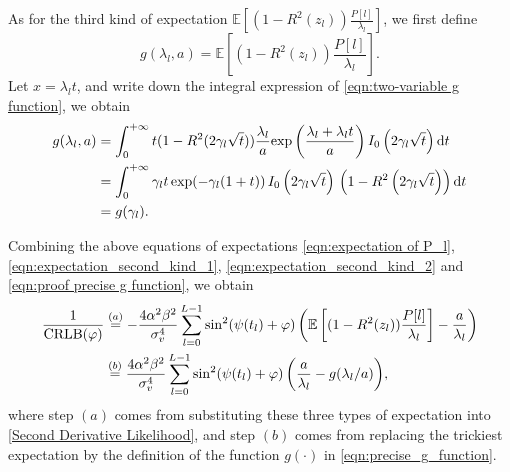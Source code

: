 \documentclass[journal,twocolumn]{IEEEtran}
\theoremstyle{nonumberplain}
\def \exp {\text{exp}}
\begin{document}
    As for the third kind of expectation $\mathbb{E}\left[(1-R^2(z_l))\frac{P[l]}{\lambda_l}\right]$, we first define 
    \begin{equation}
        g(\lambda_l, a) = \mathbb{E}\left[(1-R^2(z_l))\frac{P[l]}{\lambda_l}\right].
        \label{eqn:two-variable g function}
    \end{equation}
    Let $x=\lambda_l t$, and write down the integral expression of \eqref{eqn:two-variable g function}, we obtain 
    \begin{equation}
        \begin{aligned}
        g(\lambda_l, a) & = \int_{0}^{+\infty} t(1-R^2(2\gamma_l\sqrt{t})) \frac{\lambda_l}{a} \exp\left(\frac{\lambda_l + \lambda_l t}{a}\right) I_0\left(2\gamma_l\sqrt{t}\right){\rm d}t \\
        & = \int_{0}^{+\infty}\gamma_l t \, \exp(-\gamma_l(1+t))\, I_0\left(2\gamma_l\sqrt{t}\right)\,\left(1-R^2\left(2\gamma_l\sqrt{t}\right)\right){\rm d}t \\
        & = g(\gamma_l).
        \end{aligned}
        \label{eqn:proof precise g function}
    \end{equation}
    
    Combining the above equations of expectations \eqref{eqn:expectation of P_l}, \eqref{eqn:expectation_second_kind_1}, \eqref{eqn:expectation_second_kind_2} and \eqref{eqn:proof precise g function}, we obtain
    \begin{equation}
        \begin{aligned}
        \frac{1}{{\rm CRLB}(\varphi)} %
        & \overset{(a)}{=}  -\frac{4\alpha^2\beta^2}{\sigma_v^4}\sum_{l=0}^{L-1}{ \sin^2(\psi(t_l)+\varphi) \left(\mathbb{E}\left[(1-R^2(z_l))\frac{P[l]}{\lambda_l}\right] - \frac{a}{\lambda_l}\right) } \\
        & \overset{(b)}{=} \frac{4\alpha^2\beta^2}{\sigma_v^4}\sum_{l=0}^{L-1}{ \sin^2(\psi(t_l)+\varphi) \left(\frac{a}{\lambda_l}-g(\lambda_l/a)\right)},
        \end{aligned}
        \label{eqn:CRLB}
    \end{equation}
    where step $(a)$ comes from substituting these three types of expectation into \eqref{Second Derivative Likelihood}, and step $(b)$ comes from replacing the trickiest expectation by the definition of the function $g(\cdot)$ in \eqref{eqn:precise_g_function}.  
    
\end{document}

